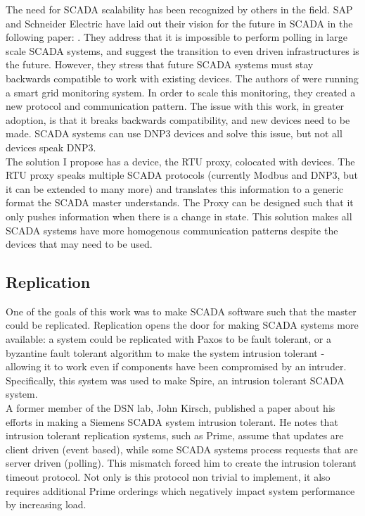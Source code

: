 \documentclass[11pt,a4paper,oldfontcommands]{memoir}
\begin{document}
\indent
The need for SCADA scalability has been recognized by others in the field.
SAP and Schneider Electric have laid out their vision for the future in SCADA in the
following paper: \cite{Architecting the next generation of service-based SCADA/DCS system of systems}. 
They address that it is impossible to perform polling in large scale SCADA systems, and
suggest the transition to even driven infrastructures is the future. However, they stress
that future SCADA systems must stay backwards compatible to work with existing devices.
The authors of \cite{Event-based hybrid metering feeding AMI and SCADA} were running
a smart grid monitoring system. In order to scale this monitoring, they created a new 
protocol and communication pattern. The issue with this work, in greater adoption,
is that it breaks backwards compatibility, and new devices need to be made. 
SCADA systems can use DNP3 devices and solve this issue, but not all devices speak
DNP3.\\

\indent
The solution I propose has a device, the RTU proxy, colocated with devices. The RTU
proxy speaks multiple SCADA protocols (currently Modbus and DNP3, but it can be extended
to many more) and translates
this information to a generic format the SCADA master understands. The Proxy
can be designed such that it only pushes information when there is a change in state.
This solution makes all SCADA systems have more homogenous communication patterns despite
the devices that may need to be used.

\subsection{Replication}

\indent \indent
One of the goals of this work was to make SCADA software such that the master could
be replicated. Replication opens the door for making SCADA systems more available:
a system could be replicated with Paxos to be fault tolerant,
or a byzantine fault tolerant algorithm to make the system intrusion tolerant -
allowing it to work even if components have been compromised by an intruder.
Specifically, this system was used to make Spire, an intrusion tolerant SCADA
system. \\

\indent 
A former member of the DSN lab, John Kirsch, published a paper \cite{Survivable SCADA Via
Intrusion-Tolerant Replication}
about his efforts in making a Siemens SCADA system intrusion tolerant. He notes that 
intrusion tolerant replication systems, such as Prime, assume that updates are 
client driven (event based), while some SCADA systems process requests that are
server driven (polling). This mismatch forced him to create the intrusion tolerant timeout
protocol. Not only is this protocol non trivial to implement, it also requires additional
Prime orderings which negatively impact system performance by increasing load. \\
\end{document}
